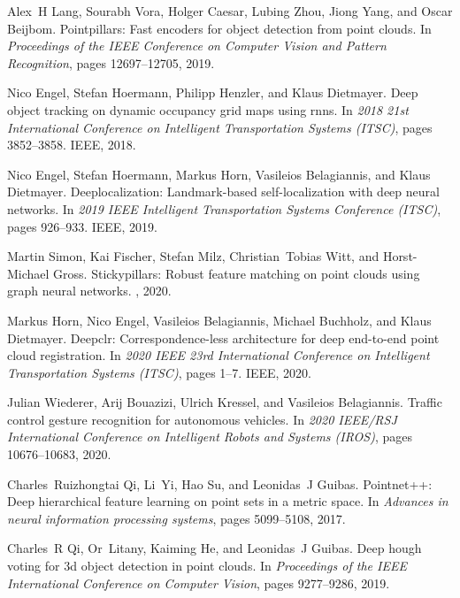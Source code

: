\documentclass{ieeeaccess}
\begin{document}
\begin{thebibliography}{10}

Alex~H Lang, Sourabh Vora, Holger Caesar, Lubing Zhou, Jiong Yang, and Oscar
  Beijbom.
\newblock Pointpillars: Fast encoders for object detection from point clouds.
\newblock In {\em Proceedings of the IEEE Conference on Computer Vision and
  Pattern Recognition}, pages 12697--12705, 2019.

Nico Engel, Stefan Hoermann, Philipp Henzler, and Klaus Dietmayer.
\newblock Deep object tracking on dynamic occupancy grid maps using rnns.
\newblock In {\em 2018 21st International Conference on Intelligent
  Transportation Systems (ITSC)}, pages 3852--3858. IEEE, 2018.

Nico Engel, Stefan Hoermann, Markus Horn, Vasileios Belagiannis, and Klaus
  Dietmayer.
\newblock Deeplocalization: Landmark-based self-localization with deep neural
  networks.
\newblock In {\em 2019 IEEE Intelligent Transportation Systems Conference
  (ITSC)}, pages 926--933. IEEE, 2019.

Martin Simon, Kai Fischer, Stefan Milz, Christian~Tobias Witt, and
  Horst-Michael Gross.
\newblock Stickypillars: Robust feature matching on point clouds using graph
  neural networks.
, 2020.

Markus Horn, Nico Engel, Vasileios Belagiannis, Michael Buchholz, and Klaus
  Dietmayer.
\newblock Deepclr: Correspondence-less architecture for deep end-to-end point
  cloud registration.
\newblock In {\em 2020 IEEE 23rd International Conference on Intelligent
  Transportation Systems (ITSC)}, pages 1--7. IEEE, 2020.

Julian Wiederer, Arij Bouazizi, Ulrich Kressel, and Vasileios Belagiannis.
\newblock Traffic control gesture recognition for autonomous vehicles.
\newblock In {\em 2020 IEEE/RSJ International Conference on Intelligent Robots
  and Systems (IROS)}, pages 10676--10683, 2020.

Charles~Ruizhongtai Qi, Li~Yi, Hao Su, and Leonidas~J Guibas.
\newblock Pointnet++: Deep hierarchical feature learning on point sets in a
  metric space.
\newblock In {\em Advances in neural information processing systems}, pages
  5099--5108, 2017.

Charles~R Qi, Or~Litany, Kaiming He, and Leonidas~J Guibas.
\newblock Deep hough voting for 3d object detection in point clouds.
\newblock In {\em Proceedings of the IEEE International Conference on Computer
  Vision}, pages 9277--9286, 2019.


\end{thebibliography}
\end{document}
